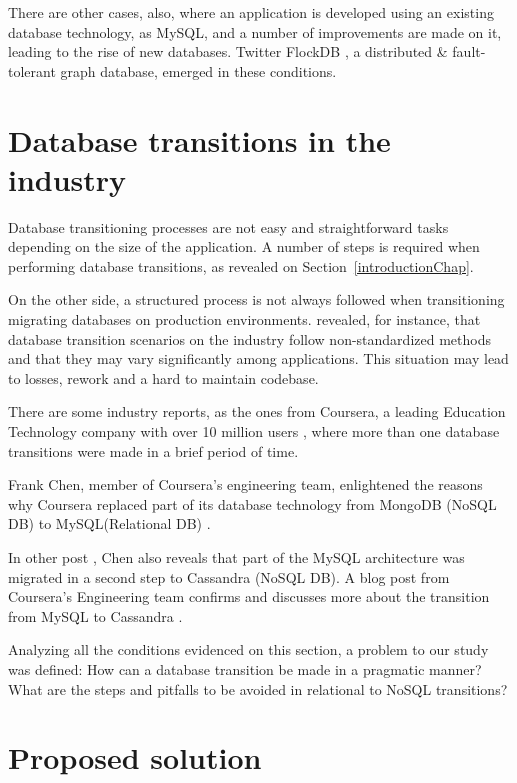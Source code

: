 There are other cases, also, where an application is developed using an existing database technology, as MySQL, and a number of improvements are made on it, leading to the rise of new databases. Twitter FlockDB \cite{flockdb}, a distributed \& fault-tolerant graph database, emerged in these conditions. 


\section{Database transitions in the industry}

Database transitioning processes are not easy and straightforward tasks depending on the size of the application. A number of steps is required when performing database transitions, as revealed on Section~\ref{introductionChap}.

On the other side, a structured process is not always followed when transitioning migrating databases on production environments. \cite{fabioMartinSM} revealed, for instance, that database transition scenarios on the industry follow non-standardized methods and that they may vary significantly among applications. This situation may lead to losses, rework and a hard to maintain codebase.

There are some industry reports, as the ones from Coursera, a leading Education Technology company with over 10 million users \cite{courserawiki}, where more than one database transitions were made in a brief period of time.  

Frank Chen, member of Coursera's engineering team, enlightened the reasons why Coursera replaced part of its database technology from MongoDB (NoSQL DB) to MySQL(Relational DB) \cite{coursera-mongodb-mysql} . 

In other post \cite{coursera-mongodb-mysql2}, Chen also reveals that part of the MySQL architecture was migrated in a second step to Cassandra (NoSQL DB). A blog post from Coursera's Engineering team confirms and discusses more about the transition from MySQL to Cassandra \cite{coursera-mysql-cassandra}. 

Analyzing all the conditions evidenced on this section, a problem to our study was defined: How can a database transition be made in a pragmatic manner? What are the steps and pitfalls to be avoided in relational to NoSQL transitions? 

\section{Proposed solution}

